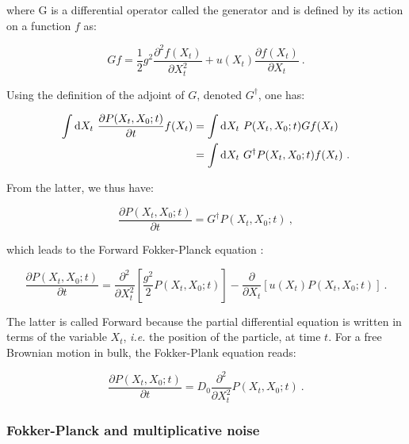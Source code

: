 where G is a differential operator called the generator and is defined by its action on a function $f$ as:

\begin{equation}
	Gf = \frac{1}{2} g^2 \frac{\partial ^2 f(X_t)}{\partial X_t^2} + u(X_t) \frac{\partial f(X_t)}{\partial X_t} ~.
\end{equation}

Using the definition of the adjoint of $G$, denoted $G ^\dagger$, one has:


\begin{equation}
	\begin{aligned}
		\int \textnormal{d} X_t ~\frac{\partial P(X_t, X_0 ; t) }{\partial t} f(X_t) &= \int \textnormal{d}X_t ~ P(X_t, X_0 ; t) G f(X_t) \\
		&= \int \textnormal{d}X_t ~  G ^\dagger P(X_t, X_0 ; t) f(X_t) ~.
	\end{aligned}
\end{equation}

From the latter, we thus have:

\begin{equation}
	\frac{\partial P(X_t, X_0 ; t)}{\partial t} = G^\dagger P(X_t, X_0 ; t) ~,
	\label{fokker3}
\end{equation}

which leads to the Forward Fokker-Planck equation \cite{del_moral_introduction_2010}:

\begin{equation}
	\frac{\partial P(X_t, X_0 ; t)}{\partial t }= \frac{\partial ^2}{\partial X_t^2} \left[\frac{g^2 }{2}P(X_t, X_0 ; t)\right] - \frac{\partial}{\partial X_t} \left[u(X_t) P(X_t, X_0 ; t)\right] ~.
	\label{Eq.Forward_Fokker_plank}
\end{equation}

The latter is called Forward because the partial differential equation is written in terms of the variable $X_t$, \textit{i.e.} the position of the particle, at time $t$. For a  free Brownian motion in bulk, the Fokker-Plank equation reads:

\begin{equation}
	\frac{\partial P(X_t, X_0 ; t)}{\partial t} = D_0 \frac{\partial ^2}{\partial X_t ^2}P(X_t, X_0 ; t) ~.
	\label{fp}
\end{equation}


\subsubsection{Fokker-Planck and multiplicative noise}

